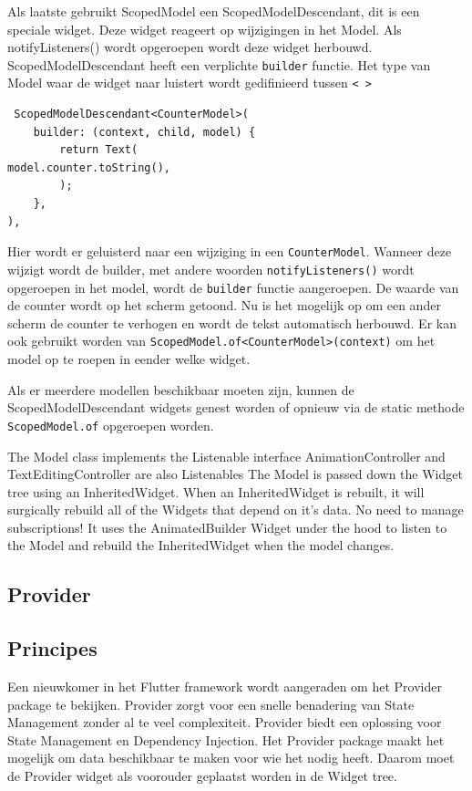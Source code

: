Als laatste gebruikt ScopedModel een ScopedModelDescendant, dit is een speciale widget. Deze widget reageert op wijzigingen in het Model. Als notifyListeners() wordt opgeroepen wordt deze widget herbouwd.
ScopedModelDescendant heeft een verplichte \verb|builder| functie. Het type van Model waar de widget naar luistert wordt gedifinieerd tussen \verb|< >|
\begin{verbatim}
 ScopedModelDescendant<CounterModel>(
    builder: (context, child, model) {
        return Text(                          model.counter.toString(), 
        );
    },
),
\end{verbatim}
Hier wordt er geluisterd naar een wijziging in een \verb|CounterModel|. Wanneer deze wijzigt wordt de builder, met andere woorden \verb|notifyListeners()| wordt opgeroepen in het model, wordt de \verb|builder| functie aangeroepen. De waarde van de counter wordt op het scherm getoond. Nu is het mogelijk op om een ander scherm de counter te verhogen en wordt de tekst automatisch herbouwd. Er kan ook gebruikt worden van \verb|ScopedModel.of<CounterModel>(context)| om het model op te roepen in eender welke widget.

Als er meerdere modellen beschikbaar moeten zijn, kunnen de ScopedModelDescendant widgets genest worden of opnieuw via de static methode \verb|ScopedModel.of| opgeroepen worden.


The Model class implements the Listenable interface
AnimationController and TextEditingController are also Listenables
The Model is passed down the Widget tree using an InheritedWidget. When an InheritedWidget is rebuilt, it will surgically rebuild all of the Widgets that depend on it's data. No need to manage subscriptions!
It uses the AnimatedBuilder Widget under the hood to listen to the Model and rebuild the InheritedWidget when the model changes.

\subsection{Provider}
\subsection*{Principes}
Een nieuwkomer in het Flutter framework wordt aangeraden om het Provider package te bekijken. Provider zorgt voor een snelle benadering van State Management zonder al te veel complexiteit. Provider biedt een oplossing voor State Management en Dependency Injection.
Het Provider package maakt het mogelijk om data beschikbaar te maken voor wie het nodig heeft. Daarom moet de Provider widget als voorouder geplaatst worden in de Widget tree.

